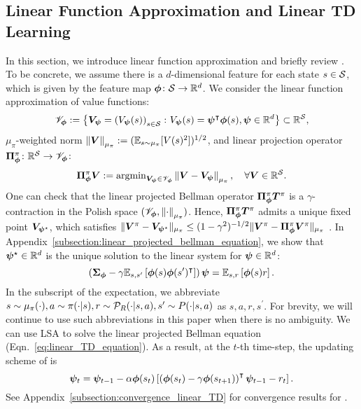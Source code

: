 \subsection{Linear Function Approximation and Linear TD Learning}\label{subsection:linear_td}
In this section, we introduce linear function approximation and briefly review {\LTD}.
To be concrete, we assume there is a $d$-dimensional feature for each state $s\in{\mathcal{S}}$, which is given by the feature map ${\bm{\phi}}\colon{\mathcal{S}}\to{\mathbb R}^d$.
We consider the linear function approximation of value functions:
\begin{equation*}
    {\mathscr{V}}_{{\bm{\phi}}} := \left\{{\bm{V}}_{{\bm{\psi}}}=\left({V_{{\bm{\psi}}}(s)}\right)_{s\in{\mathcal{S}}}\colon  V_{{\bm{\psi}}}(s)={\bm{\psi}}^{\intercal}{\bm{\phi}}(s),{\bm{\psi}}\in{\mathbb R}^{d} \right\}\subset {\mathbb R}^{\mathcal{S}},
\end{equation*}
$\mu_\pi$-weighted norm $\left\|{{\bm{V}}}\right\|_{\mu_\pi}:=({\mathbb E}_{s\sim\mu_{\pi}}[V(s)^2])^{1/2}$, and linear projection operator ${\bm{\Pi}}_{{\bm{\phi}}}^{\pi}\colon {\mathbb R}^{{\mathcal{S}}}\to{\mathscr{V}}_{{\bm{\phi}}}$:
\begin{equation*}
    {\bm{\Pi}}_{{\bm{\phi}}}^{\pi}{\bm{V}}:=\operatorname*{argmin}\nolimits_{{\bm{V}}_{{\bm{\psi}}}\in{\mathscr{V}}_{{\bm{\phi}}}}\left\|{{\bm{V}}-{\bm{V}}_{{\bm{\psi}}}}\right\|_{\mu_\pi},\quad \forall{\bm{V}}\in{\mathbb R}^{\mathcal{S}}.
\end{equation*}
One can check that the linear projected Bellman operator ${\bm{\Pi}}_{{\bm{\phi}}}^{\pi}\bm{T}^{\pi}$ is a $\gamma$-contraction in the Polish space $({\mathscr{V}}_{{\bm{\phi}}},\left\|{\cdot}\right\|_{\mu_\pi})$.
Hence, ${\bm{\Pi}}_{{\bm{\phi}}}^{\pi}\bm{T}^{\pi}$ admits a unique fixed point ${\bm{V}}_{{\bm{\psi}}^\star}$, 
which satisfies $\|{\bm{V}}^\pi-{\bm{V}}_{{\bm{\psi}}^\star} \|_{\mu_\pi}\leq(1-\gamma^2)^{-1/2}\|{\bm{V}}^\pi-{\bm{\Pi}}_{{\bm{\phi}}}^{\pi}{\bm{V}}^\pi \|_{\mu_\pi}$ \citep[Theorem~9.8][]{bdr2022}.
In Appendix~\ref{subsection:linear_projected_bellman_equation}, we show that ${\bm{\psi}}^\star\in{\mathbb R}^d$ is the unique solution to the linear system for ${\bm{\psi}}\in{\mathbb R}^d$:
\begin{equation}\label{eq:linear_TD_equation}
    \left({{\bm{\Sigma}}_{{\bm{\phi}}}-\gamma{\mathbb E}_{s,s^\prime}\left[{{\bm{\phi}}(s){\bm{\phi}}(s^\prime)^{\intercal}}\right]}\right){\bm{\psi}}={\mathbb E}_{s,r}\left[{{\bm{\phi}}(s)r}\right].
\end{equation}
In the subscript of the expectation, we abbreviate $s\sim\mu_{\pi}(\cdot), a\sim\pi(\cdot|s), r\sim {\mathcal{P}}_R(\cdot|s,a), s^\prime\sim P(\cdot|s,a)$ as $s,a,r,s^\prime$.
For brevity, we will continue to use such abbreviations in this paper when there is no ambiguity.
We can use LSA to solve the linear projected Bellman equation (Eqn.~\eqref{eq:linear_TD_equation}).
As a result, at the $t$-th time-step, the updating scheme of {\LTD} is 
\begin{equation}\label{eq:linear_TD}
    {\bm{\psi}}_t={\bm{\psi}}_{t-1}-\alpha{\bm{\phi}}(s_t)\left[{\left({{\bm{\phi}}(s_t)-\gamma{\bm{\phi}}(s_{t+1})}\right)^{\intercal}{\bm{\psi}}_{t-1} - r_t}\right].
\end{equation}
See Appendix~\ref{subsection:convergence_linear_TD} for convergence results for {\LTD}.

